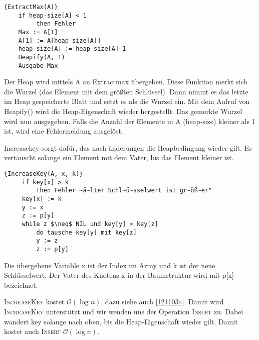 \documentclass[ngerman,draft,parskip=half*,twoside]{scrreprt}
\theoremstyle{break}
\theoremstyle{nonumberbreak}
\newcommand*{\OO}{\mathcal{O}}      %
\begin{document}
\begin{Algorithmus}[ht]
\begin{lstlisting}[frame=tlrb, mathescape=true, title=\textsc{ExtractMax\textnormal{(A)}}, gobble=4]{ExtractMax(A)}
    if heap-size[A] < 1
         then Fehler
    Max := A[1]
    A[1] := A[heap-size[A]]
    heap-size[A] := heap-size[A]-1
    Heapify(A, 1)
    Ausgabe Max
\end{lstlisting}

Der Heap wird mittels A an Extractmax übergeben. Diese Funktion merkt sich die Wurzel (das Element mit dem größten Schlüssel).
Dann nimmt es das letzte im Heap gespeicherte Blatt und setzt es als die Wurzel ein. Mit dem Aufruf von Heapify() wird die
Heap-Eigenschaft wieder hergestellt. Das gemerkte Wurzel wird nun ausgegeben.
Falls die Anzahl der Elemente in A (heap-size) kleiner als 1 ist, wird eine Fehlermeldung ausgelöst.
\end{Algorithmus}

Increasekey sorgt dafür, das nach änderungen die Heapbedingung wieder gilt. Es vertauscht solange ein Element mit dem Vater, bis
das Element kleiner ist.

\begin{Algorithmus}[ht]
\begin{lstlisting}[frame=tlrb, mathescape=true, title=\textsc{IncreaseKey\textnormal{(A, x, k)}}, gobble=4]{IncreaseKey(A, x, k)}
     if key[x] > k
         then Fehler ~ä~lter Schl~ü~sselwert ist gr~öß~er"    
     key[x] := k
     y := x
     z := p[y]
     while z $\neq$ NIL und key[y] > key[z]
         do tausche key[y] mit key[z]
         y := z
         z := p[y]
\end{lstlisting}

Die übergebene Variable x ist der Index im Array und k ist der neue Schlüsselwert. Der Vater des Knotens x in
der Baumstruktur wird mit p[x] bezeichnet.
\end{Algorithmus}
\textsc{IncreaseKey} kostet $\OO(\log n)$, dazu siehe auch \autoref{121103a}.
Damit wird \textsc{IncreaseKey} unterstützt und wir wenden uns der Operation \textsc{Insert} zu.
Dabei wandert key solange nach oben, bis die Heap-Eigenschaft wieder gilt. Damit kostet auch \textsc{Insert} $\OO(\log n)$.
\end{document}
